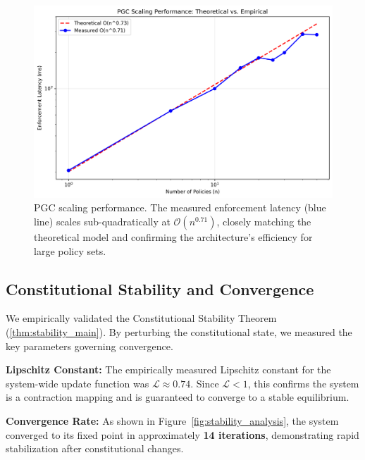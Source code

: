 \documentclass[10pt,twocolumn]{article}
\newcommand{\lipschitz}{\mathcal{L}}
\newcommand{\bigO}{\mathcal{O}}
\theoremstyle{definition}
\begin{document}
\begin{figure}[H]
    \centering
    \includegraphics[width=\linewidth]{scaling_validation.png}
    \caption{PGC scaling performance. The measured enforcement latency (blue line) scales sub-quadratically at $\bigO(n^{0.71})$, closely matching the theoretical model and confirming the architecture's efficiency for large policy sets.}
    \label{fig:scaling_validation}
\end{figure}

\subsection{Constitutional Stability and Convergence}
We empirically validated the Constitutional Stability Theorem (\ref{thm:stability_main}). By perturbing the constitutional state, we measured the key parameters governing convergence.

\textbf{Lipschitz Constant:} The empirically measured Lipschitz constant for the system-wide update function was $\lipschitz \approx 0.74$. Since $\lipschitz < 1$, this confirms the system is a contraction mapping and is guaranteed to converge to a stable equilibrium.

\textbf{Convergence Rate:} As shown in Figure~\ref{fig:stability_analysis}, the system converged to its fixed point in approximately \textbf{14 iterations}, demonstrating rapid stabilization after constitutional changes.
\end{document}
